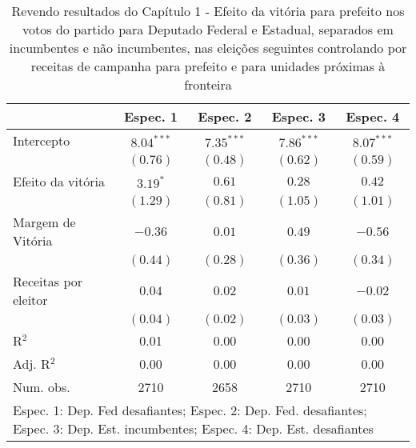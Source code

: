 
\begin{table}
\begin{center}
\begin{tabular}{l c c c c }
\hline
                     & Espec. 1 & Espec. 2 & Espec. 3 & Espec. 4 \\
\hline
Intercepto           & $8.04^{***}$ & $7.35^{***}$ & $7.86^{***}$ & $8.07^{***}$ \\
                     & $(0.76)$     & $(0.48)$     & $(0.62)$     & $(0.59)$     \\
Efeito da vitória    & $3.19^{*}$   & $0.61$       & $0.28$       & $0.42$       \\
                     & $(1.29)$     & $(0.81)$     & $(1.05)$     & $(1.01)$     \\
Margem de Vitória    & $-0.36$      & $0.01$       & $0.49$       & $-0.56$      \\
                     & $(0.44)$     & $(0.28)$     & $(0.36)$     & $(0.34)$     \\
Receitas por eleitor & $0.04$       & $0.02$       & $0.01$       & $-0.02$      \\
                     & $(0.04)$     & $(0.02)$     & $(0.03)$     & $(0.03)$     \\
\hline
R$^2$                & 0.01         & 0.00         & 0.00         & 0.00         \\
Adj. R$^2$           & 0.00         & 0.00         & 0.00         & 0.00         \\
Num. obs.            & 2710         & 2658         & 2710         & 2710         \\
\hline
\multicolumn{5}{l}{\scriptsize{Espec. 1: Dep. Fed desafiantes; Espec. 2: Dep. Fed. desafiantes; Espec. 3: Dep. Est. incumbentes; Espec. 4: Dep. Est. desafiantes}}
\end{tabular}
\caption{Revendo resultados do Capítulo 1 - Efeito da vitória para prefeito nos votos do partido para Deputado Federal e Estadual, separados em incumbentes e não incumbentes, nas eleições seguintes controlando por receitas de campanha para prefeito e para unidades próximas à fronteira}
\label{tab:c4t3}
\end{center}
\end{table}

